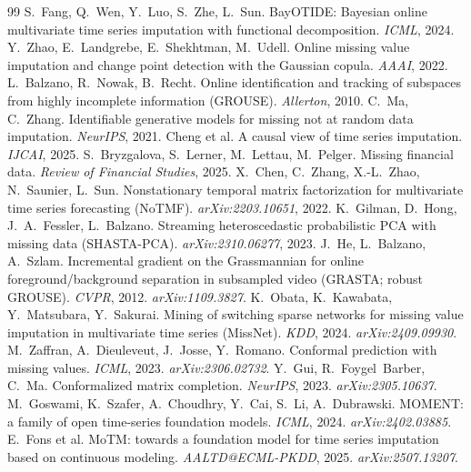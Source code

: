 \documentclass[10pt,twocolumn]{article}
\begin{document}
\begin{thebibliography}{99}
 S.~Fang, Q.~Wen, Y.~Luo, S.~Zhe, L.~Sun. BayOTIDE:
Bayesian online multivariate time series imputation with functional
decomposition. \emph{ICML}, 2024.
 Y.~Zhao, E.~Landgrebe, E.~Shekhtman, M.~Udell. Online
missing value imputation and change point detection with the Gaussian copula.
\emph{AAAI}, 2022.
 L.~Balzano, R.~Nowak, B.~Recht. Online identification
and tracking of subspaces from highly incomplete information (GROUSE).
\emph{Allerton}, 2010.
 C.~Ma, C.~Zhang. Identifiable generative models for missing
not at random data imputation. \emph{NeurIPS}, 2021.
 Cheng et al. A causal view of time series
imputation. \emph{IJCAI}, 2025.
 S.~Bryzgalova, S.~Lerner, M.~Lettau, M.~Pelger.
Missing financial data. \emph{Review of Financial Studies}, 2025.
 X.~Chen, C.~Zhang, X.-L.~Zhao, N.~Saunier, L.~Sun.
Nonstationary temporal matrix factorization for multivariate time series
forecasting (NoTMF). \emph{arXiv:2203.10651}, 2022.
 K.~Gilman, D.~Hong, J.~A.~Fessler, L.~Balzano.
Streaming heteroscedastic probabilistic PCA with missing data (SHASTA-PCA).
\emph{arXiv:2310.06277}, 2023.
 J.~He, L.~Balzano, A.~Szlam. Incremental gradient on the
Grassmannian for online foreground/background separation in subsampled video
(GRASTA; robust GROUSE). \emph{CVPR}, 2012. \emph{arXiv:1109.3827}.
 K.~Obata, K.~Kawabata, Y.~Matsubara, Y.~Sakurai.
Mining of switching sparse networks for missing value imputation in multivariate
time series (MissNet). \emph{KDD}, 2024. \emph{arXiv:2409.09930}.
 M.~Zaffran, A.~Dieuleveut, J.~Josse, Y.~Romano.
Conformal prediction with missing values. \emph{ICML}, 2023. \emph{arXiv:2306.02732}.
 Y.~Gui, R.~Foygel~Barber, C.~Ma. Conformalized matrix
completion. \emph{NeurIPS}, 2023. \emph{arXiv:2305.10637}.
 M.~Goswami, K.~Szafer, A.~Choudhry, Y.~Cai, S.~Li,
A.~Dubrawski. MOMENT: a family of open time-series foundation models.
\emph{ICML}, 2024. \emph{arXiv:2402.03885}.
 E.~Fons et al. MoTM: towards a foundation model for time
series imputation based on continuous modeling. \emph{AALTD@ECML-PKDD}, 2025.
\emph{arXiv:2507.13207}.

\end{thebibliography}
\end{document}
